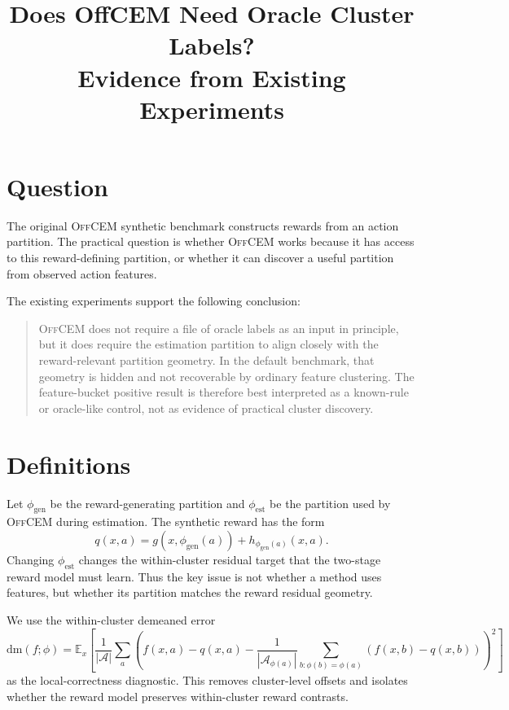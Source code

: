 \documentclass[11pt]{article}
\title{Does OffCEM Need Oracle Cluster Labels?\\Evidence from Existing Experiments}
\date{}
\newcommand{\OffCEM}{\textsc{OffCEM}}
\newcommand{\dm}{\mathrm{dm}}
\begin{document}
\maketitle

\section{Question}

The original \OffCEM{} synthetic benchmark constructs rewards from an action
partition. The practical question is whether \OffCEM{} works because it has
access to this reward-defining partition, or whether it can discover a useful
partition from observed action features.

The existing experiments support the following conclusion:

\begin{quote}
\OffCEM{} does not require a file of oracle labels as an input in principle, but
it does require the estimation partition to align closely with the
reward-relevant partition geometry. In the default benchmark, that geometry is
hidden and not recoverable by ordinary feature clustering. The feature-bucket
positive result is therefore best interpreted as a known-rule or oracle-like
control, not as evidence of practical cluster discovery.
\end{quote}

\section{Definitions}

Let $\phi_{\mathrm{gen}}$ be the reward-generating partition and
$\phi_{\mathrm{est}}$ be the partition used by \OffCEM{} during estimation. The
synthetic reward has the form
\[
q(x,a) = g(x,\phi_{\mathrm{gen}}(a)) + h_{\phi_{\mathrm{gen}}(a)}(x,a).
\]
Changing $\phi_{\mathrm{est}}$ changes the within-cluster residual target that
the two-stage reward model must learn. Thus the key issue is not whether a
method uses features, but whether its partition matches the reward residual
geometry.

We use the within-cluster demeaned error
\[
\dm(f;\phi) =
\mathbb{E}_x\left[
  \frac{1}{|\mathcal{A}|}
  \sum_a
  \left(
    f(x,a)-q(x,a)
    -
    \frac{1}{|\mathcal{A}_{\phi(a)}|}
    \sum_{b:\phi(b)=\phi(a)}(f(x,b)-q(x,b))
  \right)^2
\right]
\]
as the local-correctness diagnostic. This removes cluster-level offsets and
isolates whether the reward model preserves within-cluster reward contrasts.
\end{document}
